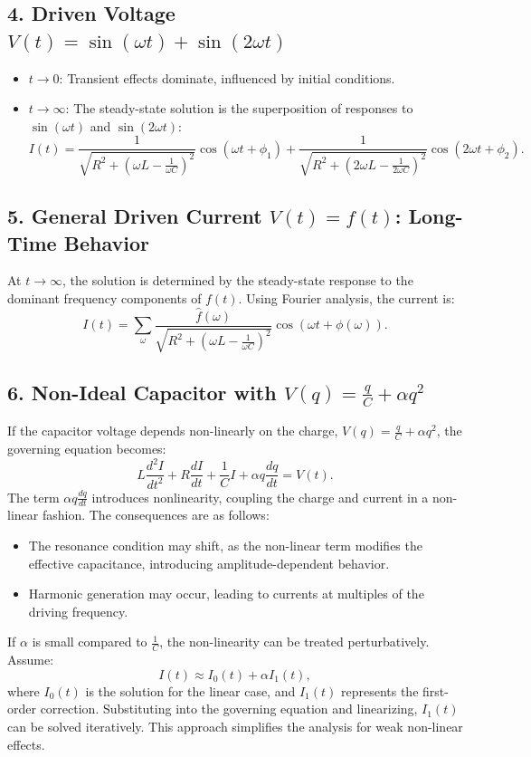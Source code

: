\documentclass[a4paper,11pt]{article}
\begin{document}
\subsection*{4. Driven Voltage \(V(t) = \sin(\omega t) + \sin(2\omega t)\)}
\begin{itemize}
    \item \(t \to 0\): Transient effects dominate, influenced by initial conditions.
    \item \(t \to \infty\): The steady-state solution is the superposition of responses to \(\sin(\omega t)\) and \(\sin(2\omega t)\):
    \[
    I(t) = \frac{1}{\sqrt{R^2 + \left(\omega L - \frac{1}{\omega C}\right)^2}} \cos(\omega t + \phi_1) + \frac{1}{\sqrt{R^2 + \left(2\omega L - \frac{1}{2\omega C}\right)^2}} \cos(2\omega t + \phi_2).
    \]
\end{itemize}

\subsection*{5. General Driven Current \(V(t) = f(t)\): Long-Time Behavior}
At \(t \to \infty\), the solution is determined by the steady-state response to the dominant frequency components of \(f(t)\). Using Fourier analysis, the current is:
\[
I(t) = \sum_{\omega} \frac{\hat{f}(\omega)}{\sqrt{R^2 + \left(\omega L - \frac{1}{\omega C}\right)^2}} \cos(\omega t + \phi(\omega)).
\]

\subsection*{6. Non-Ideal Capacitor with \(V(q) = \frac{q}{C} + \alpha q^2\)}
If the capacitor voltage depends non-linearly on the charge, \(V(q) = \frac{q}{C} + \alpha q^2\), the governing equation becomes:
\[
L \frac{d^2I}{dt^2} + R \frac{dI}{dt} + \frac{1}{C} I + \alpha q \frac{dq}{dt} = V(t).
\]
The term \(\alpha q \frac{dq}{dt}\) introduces nonlinearity, coupling the charge and current in a non-linear fashion. The consequences are as follows:
\begin{itemize}
    \item The resonance condition may shift, as the non-linear term modifies the effective capacitance, introducing amplitude-dependent behavior.
    \item Harmonic generation may occur, leading to currents at multiples of the driving frequency.
\end{itemize}

If \(\alpha\) is small compared to \(\frac{1}{C}\), the non-linearity can be treated perturbatively. Assume:
\[
I(t) \approx I_0(t) + \alpha I_1(t),
\]
where \(I_0(t)\) is the solution for the linear case, and \(I_1(t)\) represents the first-order correction. Substituting into the governing equation and linearizing, \(I_1(t)\) can be solved iteratively. This approach simplifies the analysis for weak non-linear effects.
\end{document}
